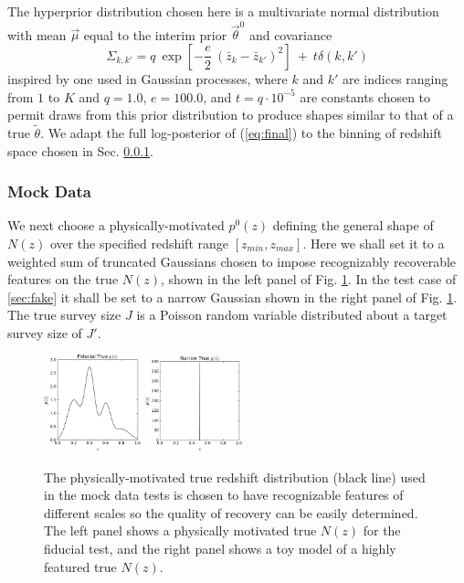 \documentclass[preprint]{aastex}
\begin{document}
The hyperprior distribution chosen here is a multivariate normal distribution 
with mean $\vec{\mu}$ equal to the interim prior $\vec{\theta}^{0}$ and 
covariance
\begin{equation}
\label{eq:priorcov}
\Sigma_{k,k'} = q\ \exp[-\frac{e}{2}\ (\bar{z}_{k}-\bar{z}_{k'})^{2}]\ +\ 
t\delta(k,k')
\end{equation}
inspired by one used in Gaussian processes, where $k$ and $k'$ are indices 
ranging from $1$ to $K$ and $q=1.0$, $e=100.0$, and $t=q\cdot10^{-5}$ are 
constants chosen to permit draws from this prior distribution to produce shapes 
similar to that of a true $\tilde{\theta}$.  We adapt the full log-posterior of 
(\ref{eq:final}) to the binning of redshift space chosen in Sec. \ref{sec:mock}.

\subsubsection{Mock Data}
\label{sec:mock}

We next choose a physically-motivated $p^{0}(z)$ defining the general shape of 
$N(z)$ over the specified redshift range $[z_{min},z_{max}]$.  Here we shall 
set it to a weighted sum of truncated Gaussians chosen to impose recognizably 
recoverable features on the true $N(z)$, shown in the left panel of Fig. 
\ref{fig:physpz}.  In the test case of \ref{sec:fake} it shall be set to a 
narrow Gaussian shown in the right panel of Fig. \ref{fig:physpz}.  The true 
survey size $J$ is a Poisson random variable distributed about a target survey 
size of $J'$.

\begin{figure}
\includegraphics[width=0.25\textwidth]{figs/null/physPz.pdf}
\includegraphics[width=0.25\textwidth]{figs/delt/physPz.pdf}
\caption{The physically-motivated true redshift distribution (black line) used 
in the mock data tests is chosen to have recognizable features of different 
scales so the quality of recovery can be easily determined.  The left panel 
shows a physically motivated true $N(z)$ for the fiducial test, and the right 
panel shows a toy model of a highly featured true $N(z)$.}
\label{fig:physpz}
\end{figure}
\end{document}
